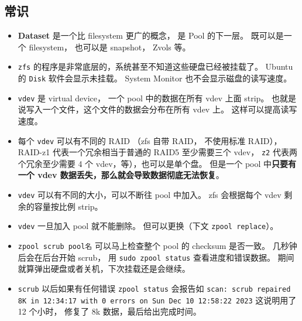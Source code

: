 \subsection{常识}
\begin{itemize}
\item \textbf{Dataset} 是一个比 filesystem 更广的概念， 是 Pool 的下一层。 既可以是一个 filesystem， 也可以是 snapshot， Zvols 等。
\item \verb|zfs| 的程序是非常底层的，系统甚至不知道这些硬盘已经被挂载了。 Ubuntu 的 \verb|Disk| 软件会显示未挂载。 System Monitor 也不会显示磁盘的读写速度。
\item \verb|vdev| 是 virtual device， 一个 pool 中的数据在所有 vdev 上面 strip。 也就是说写入一个文件，这个文件的数据会分布在所有 vdev 上。 这样可以提高读写速度。
\item 每个 \verb|vdev| 可以有不同的 RAID （zfs 自带 RAID， 不使用标准 RAID），RAID-z1 代表一个冗余相当于普通的 RAID5 至少需要三个 vdev， \verb|z2| 代表两个冗余至少需要 4 个 vdev，等），也可以是单个盘。 但是一个 pool 中\textbf{只要有一个 vdev 数据丢失，那么就会导致数据彻底无法恢复}。
\item \verb|vdev| 可以有不同的大小，可以不断往 pool 中加入。 zfs 会根据每个 vdev 剩余的容量按比例 strip。
\item \verb|vdev| 一旦加入 pool 就不能删除。 但可以更换（下文 \verb|zpool replace|）。
\item \verb|zpool scrub pool名| 可以马上检查整个 pool 的 checksum 是否一致。 几秒钟后会在后台开始 scrub， 用 \verb|sudo zpool status| 查看进度和错误数据。 期间就算弹出硬盘或者关机，下次挂载还是会继续。
\item \verb`scrub` 以后如果有任何错误 \verb`zpool status` 会报告如 \verb`scan: scrub repaired 8K in 12:34:17 with 0 errors on Sun Dec 10 12:58:22 2023` 这说明用了 12 个小时， 修复了 8k 数据，最后给出完成时间。
\end{itemize}

